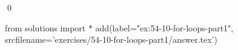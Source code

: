 
\begin{ex}
  \label{ex:54-10-for-loops-part1}
  
  \qed
\end{ex}
\begin{python0}
from solutions import *
add(label="ex:54-10-for-loops-part1",
    srcfilename='exercises/54-10-for-loops-part1/answer.tex')
\end{python0}
